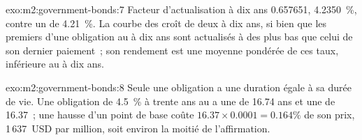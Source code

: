 \begin{solution}{exo:m2:government-bonds:7}
Facteur d'actualisation à dix ans 0.657651,  4.2350~\%, contre un
 de 4.21~\%. La courbe des  croît de deux à dix ans, si bien que les
premiers  d'une obligation au  à dix ans sont actualisés à des  plus bas que
celui de son dernier paiement~; son rendement est une moyenne pondérée de ces taux, inférieure au
 à dix ans.
\end{solution}

\begin{solution}{exo:m2:government-bonds:8}
Seule une obligation  a une duration égale à sa durée de vie. Une
obligation de 4.5~\% à trente ans au  a une  de 16.74 ans et une
 de 16.37~; une hausse d'un point de base coûte $16.37 \times 0.0001 = 0.164\%$ de son prix,
1\,637~USD par million, soit environ la moitié de l'affirmation.
\end{solution}

